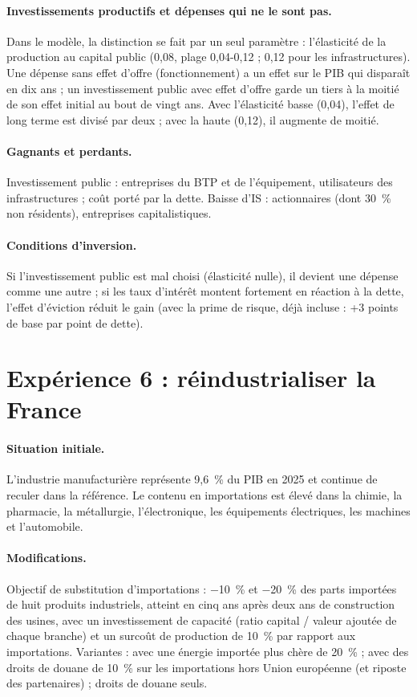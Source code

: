 \paragraph{Investissements productifs et dépenses qui ne le sont pas.} Dans le modèle, la distinction se fait par un seul
paramètre : l'élasticité de la production au capital public (0,08, plage 0,04-0,12 ; 0,12 pour les infrastructures).
Une dépense sans effet d'offre (fonctionnement) a un effet sur le PIB qui disparaît en dix ans ; un investissement public
avec effet d'offre garde un tiers à la moitié de son effet initial au bout de vingt ans. Avec l'élasticité basse (0,04),
l'effet de long terme est divisé par deux ; avec la haute (0,12), il augmente de moitié.

\paragraph{Gagnants et perdants.} Investissement public : entreprises du BTP et de l'équipement, utilisateurs des
infrastructures ; coût porté par la dette. Baisse d'IS : actionnaires (dont 30~\% non résidents), entreprises
capitalistiques.

\paragraph{Conditions d'inversion.} Si l'investissement public est mal choisi (élasticité nulle), il devient une
dépense comme une autre ; si les taux d'intérêt montent fortement en réaction à la dette, l'effet d'éviction réduit le
gain (avec la prime de risque, déjà incluse : +3 points de base par point de dette).

\section{Expérience 6 : réindustrialiser la France}
\label{sec:exp6}

\paragraph{Situation initiale.} L'industrie manufacturière représente 9,6~\% du PIB en 2025 et continue de reculer dans la
référence. Le contenu en importations est élevé dans la chimie, la pharmacie, la métallurgie, l'électronique, les
équipements électriques, les machines et l'automobile.

\paragraph{Modifications.} Objectif de substitution d'importations : $-$10~\% et $-$20~\% des parts importées de huit produits
industriels, atteint en cinq ans après deux ans de construction des usines, avec un investissement de capacité
(ratio capital / valeur ajoutée de chaque branche) et un surcoût de production de 10~\% par rapport aux importations.
Variantes : avec une énergie importée plus chère de 20~\% ; avec des droits de douane de 10~\% sur les importations hors
Union européenne (et riposte des partenaires) ; droits de douane seuls.

